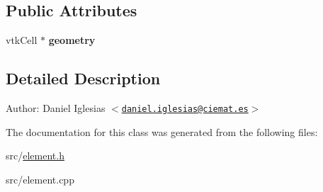 \subsection*{Public Attributes}
\begin{CompactItemize}
\item 
\hypertarget{classElement_3c475b7e8da464c6aa746ed2ae79ab3f}{
vtkCell $\ast$ \textbf{geometry}}
\label{classElement_3c475b7e8da464c6aa746ed2ae79ab3f}

\end{CompactItemize}


\subsection{Detailed Description}
\begin{Desc}
\item[Author:]Daniel Iglesias $<$\href{mailto:daniel.iglesias@ciemat.es}{\tt daniel.iglesias@ciemat.es}$>$ \end{Desc}


The documentation for this class was generated from the following files:\begin{CompactItemize}
\item 
src/\hyperlink{element_8h}{element.h}\item 
src/element.cpp\end{CompactItemize}
